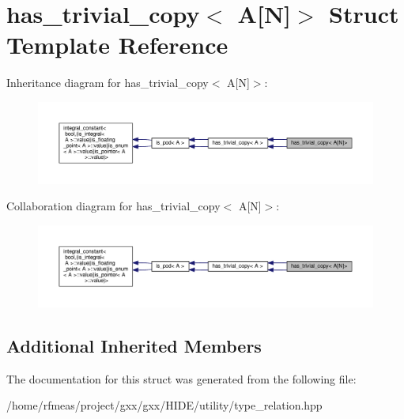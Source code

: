\hypertarget{structhas__trivial__copy_3_01A[N]_4}{}\section{has\+\_\+trivial\+\_\+copy$<$ A\mbox{[}N\mbox{]}$>$ Struct Template Reference}
\label{structhas__trivial__copy_3_01A[N]_4}


Inheritance diagram for has\+\_\+trivial\+\_\+copy$<$ A\mbox{[}N\mbox{]}$>$\+:
\nopagebreak
\begin{figure}[H]
\begin{center}
\leavevmode
\includegraphics[width=350pt]{structhas__trivial__copy_3_01A[N]_4__inherit__graph}
\end{center}
\end{figure}


Collaboration diagram for has\+\_\+trivial\+\_\+copy$<$ A\mbox{[}N\mbox{]}$>$\+:
\nopagebreak
\begin{figure}[H]
\begin{center}
\leavevmode
\includegraphics[width=350pt]{structhas__trivial__copy_3_01A[N]_4__coll__graph}
\end{center}
\end{figure}
\subsection*{Additional Inherited Members}


The documentation for this struct was generated from the following file\+:\begin{DoxyCompactItemize}
\item 
/home/rfmeas/project/gxx/gxx/\+H\+I\+D\+E/utility/type\+\_\+relation.\+hpp\end{DoxyCompactItemize}

